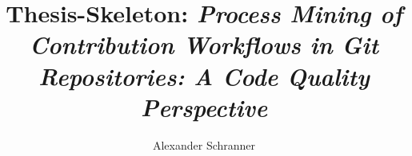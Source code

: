 \documentclass[bachelor]{padsthesis}
\begin{document}
\author{Alexander Schranner}
\title{Thesis-Skeleton: \textit{Process Mining of Contribution Workflows in Git Repositories: A Code Quality Perspective}}

\maketitle

\frontmatter

%



\tableofcontents


\mainmatter









% 







% 
% 
% 
% 
% 
% 
% 
% 
% 


\backmatter
\printbibliography
\end{document}
